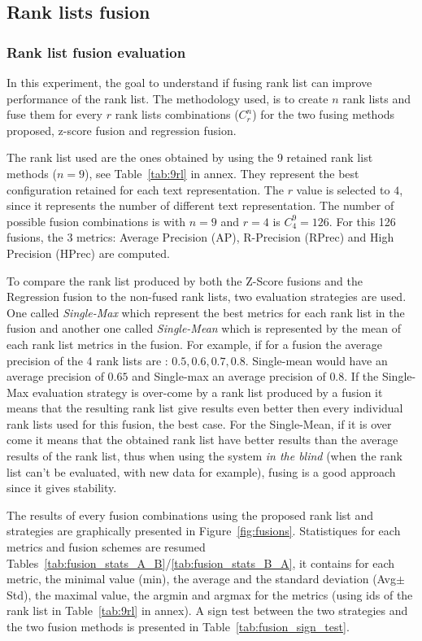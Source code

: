 \subsection{Rank lists fusion}

\subsubsection{Rank list fusion evaluation \label{sec:eval_fusion}}

In this experiment, the goal to understand if fusing rank list can improve performance of the rank list.
The methodology used, is to create $n$ rank lists and fuse them for every $r$ rank lists combinations ($C^n_r$) for the two fusing methods proposed, z-score fusion and regression fusion.

The rank list used are the ones obtained by using the 9 retained rank list methods ($n=9$), see Table~\ref{tab:9rl} in annex.
They represent the best configuration retained for each text representation.
The $r$ value is selected to $4$, since it represents the number of different text representation.
The number of possible fusion combinations is with $n=9$ and $r=4$ is $C^{9}_{4} = 126$.
For this 126 fusions, the 3 metrics: Average Precision (AP), R-Precision (RPrec) and High Precision (HPrec) are computed.

To compare the rank list produced by both the Z-Score fusions and the Regression fusion to the non-fused rank lists, two evaluation strategies are used.
One called \textit{Single-Max} which represent the best metrics for each rank list in the fusion and another one called \textit{Single-Mean} which is represented by the mean of each rank list metrics in the fusion.
For example, if for a fusion the average precision of the 4 rank lists are : $0.5, 0.6, 0.7, 0.8$. Single-mean would have an average precision of $0.65$ and Single-max an average precision of $0.8$.
If the Single-Max evaluation strategy is over-come by a rank list produced by a fusion it means that the resulting rank list give results even better then every individual rank lists used for this fusion, the best case.
For the Single-Mean, if it is over come it means that the obtained rank list have better results than the average results of the rank list, thus when using the system \textit{in the blind} (when the rank list can't be evaluated, with new data for example), fusing is a good approach since it gives stability.

The results of every fusion combinations using the proposed rank list and strategies are graphically presented in Figure~\ref{fig:fusions}.
Statistiques for each metrics and fusion schemes are resumed Tables~\ref{tab:fusion_stats_A_B}/\ref{tab:fusion_stats_B_A}, it contains for each metric, the minimal value (min), the average and the standard deviation (Avg$\pm$Std), the maximal value, the argmin and argmax for the metrics (using ids of the rank list in Table~\ref{tab:9rl} in annex).
A sign test between the two strategies and the two fusion methods is presented in Table~\ref{tab:fusion_sign_test}.

